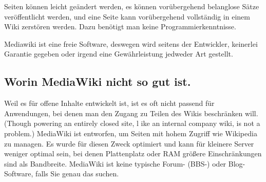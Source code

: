 Seiten können leicht geändert werden, es können vorübergehend belanglose Sätze veröffentlicht werden, und eine Seite kann vorübergehend vollständig in einem Wiki zerstören werden. Dazu benötigt man keine Programmierkenntnisse.

Mediawiki ist eine freie Software, deswegen wird seitens der Entwickler, keinerlei Garantie gegeben oder irgend eine Gewährleistung jedweder Art gestellt.


\subsection{Worin MediaWiki nicht so gut ist.}
Weil es für offene Inhalte entwickelt ist, ist es oft nicht passend für Anwendungen, bei denen man den Zugang zu Teilen des Wikis beschränken will. (Though powering an entirely closed site, l	ike an internal company wiki, is not a problem.) 
MediaWiki ist entworfen, um Seiten mit hohem Zugriff wie Wikipedia zu managen. Es wurde für diesen Zweck optimiert und kann für kleinere Server weniger optimal sein, bei denen Plattenplatz oder RAM größere Einschränkungen sind als Bandbreite. 
MediaWiki ist keine typische Forum- (BBS-) oder Blog-Software, falls Sie genau das suchen. 
